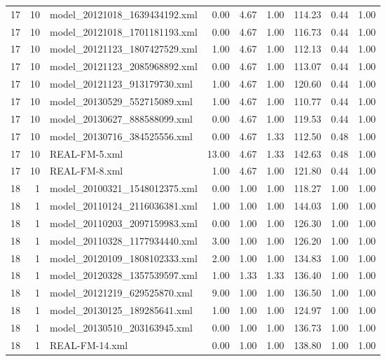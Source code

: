 \begin{table}[ht]
\begin{tabular}{rrlrrrrrr}
   17 &  10 & model\_20121018\_1639434192.xml & 0.00 & 4.67 & 1.00 & 114.23 & 0.44 & 1.00 \\ 
   17 &  10 & model\_20121018\_1701181193.xml & 0.00 & 4.67 & 1.00 & 116.73 & 0.44 & 1.00 \\ 
   17 &  10 & model\_20121123\_1807427529.xml & 1.00 & 4.67 & 1.00 & 112.13 & 0.44 & 1.00 \\ 
   17 &  10 & model\_20121123\_2085968892.xml & 0.00 & 4.67 & 1.00 & 113.07 & 0.44 & 1.00 \\ 
   17 &  10 & model\_20121123\_913179730.xml & 1.00 & 4.67 & 1.00 & 120.60 & 0.44 & 1.00 \\ 
   17 &  10 & model\_20130529\_552715089.xml & 1.00 & 4.67 & 1.00 & 110.77 & 0.44 & 1.00 \\ 
   17 &  10 & model\_20130627\_888588099.xml & 0.00 & 4.67 & 1.00 & 119.53 & 0.44 & 1.00 \\ 
   17 &  10 & model\_20130716\_384525556.xml & 0.00 & 4.67 & 1.33 & 112.50 & 0.48 & 1.00 \\ 
   17 &  10 & REAL-FM-5.xml & 13.00 & 4.67 & 1.33 & 142.63 & 0.48 & 1.00 \\ 
   17 &  10 & REAL-FM-8.xml & 1.00 & 4.67 & 1.00 & 121.80 & 0.44 & 1.00 \\ 
   18 &   1 & model\_20100321\_1548012375.xml & 0.00 & 1.00 & 1.00 & 118.27 & 1.00 & 1.00 \\ 
   18 &   1 & model\_20110124\_2116036381.xml & 1.00 & 1.00 & 1.00 & 144.03 & 1.00 & 1.00 \\ 
   18 &   1 & model\_20110203\_2097159983.xml & 0.00 & 1.00 & 1.00 & 126.30 & 1.00 & 1.00 \\ 
   18 &   1 & model\_20110328\_1177934440.xml & 3.00 & 1.00 & 1.00 & 126.20 & 1.00 & 1.00 \\ 
   18 &   1 & model\_20120109\_1808102333.xml & 2.00 & 1.00 & 1.00 & 134.83 & 1.00 & 1.00 \\ 
   18 &   1 & model\_20120328\_1357539597.xml & 1.00 & 1.33 & 1.33 & 136.40 & 1.00 & 1.00 \\ 
   18 &   1 & model\_20121219\_629525870.xml & 9.00 & 1.00 & 1.00 & 136.50 & 1.00 & 1.00 \\ 
   18 &   1 & model\_20130125\_189285641.xml & 1.00 & 1.00 & 1.00 & 124.97 & 1.00 & 1.00 \\ 
   18 &   1 & model\_20130510\_203163945.xml & 0.00 & 1.00 & 1.00 & 136.73 & 1.00 & 1.00 \\ 
   18 &   1 & REAL-FM-14.xml & 0.00 & 1.00 & 1.00 & 138.80 & 1.00 & 1.00 \\ 

\end{tabular}
\end{table}
